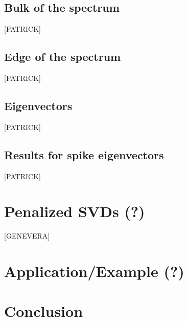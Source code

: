\documentclass{eoeauth}
\begin{document}
\subsection{Bulk of the spectrum}
[PATRICK]

\subsection{Edge of the spectrum}
[PATRICK]

\subsection{Eigenvectors}
[PATRICK]

\subsection{Results for spike eigenvectors}
[PATRICK]

\section{Penalized SVDs (?)}
[GENEVERA]

\section{Application/Example (?)}

\section{Conclusion}
\end{document}
